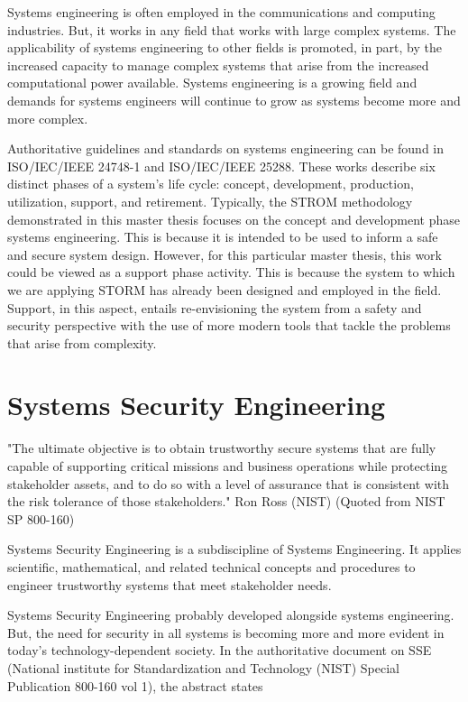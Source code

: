\documentclass[../../main/main.tex]{subfiles}
\begin{document}
Systems engineering is often employed in the communications and computing industries. But, it works in any field that works with large complex systems.  The applicability of systems engineering to other fields is promoted, in part, by the increased capacity to manage complex systems that arise from the increased computational power available.  Systems engineering is a growing field and demands for systems engineers will continue to grow as systems become more and more complex.

Authoritative guidelines and standards on systems engineering can be found in ISO/IEC/IEEE 24748-1 and ISO/IEC/IEEE 25288.  These works describe six distinct phases of a system's life cycle: concept, development, production, utilization, support, and retirement.  Typically, the STROM methodology demonstrated in this master thesis focuses on the concept and development phase systems engineering. This is because it is intended to be used to inform a safe and secure system design.  However, for this particular master thesis, this work could be viewed as a support phase activity. This is because the system to which we are applying STORM has already been designed and employed in the field.   Support, in this aspect, entails re-envisioning the system from a safety and security perspective with the use of more modern tools that tackle the problems that arise from complexity.
\section{Systems Security Engineering}\label{sesc:sse}
"The ultimate objective is to obtain trustworthy secure systems that are fully capable of supporting critical missions and business operations while protecting stakeholder assets, and to do so with a level of assurance that is consistent with the risk tolerance of those stakeholders."
Ron Ross (NIST) (Quoted from NIST SP 800-160)

Systems Security Engineering  is a subdiscipline of Systems Engineering.  It applies scientific, mathematical, and related technical concepts and procedures to engineer trustworthy systems that meet stakeholder needs. 

Systems Security Engineering probably developed alongside systems engineering.  But, the need for security in all systems is becoming more and more evident in today's technology-dependent society.  In the authoritative document on SSE (National institute for Standardization and Technology (NIST) Special Publication 800-160 vol 1), the abstract states
\end{document}
